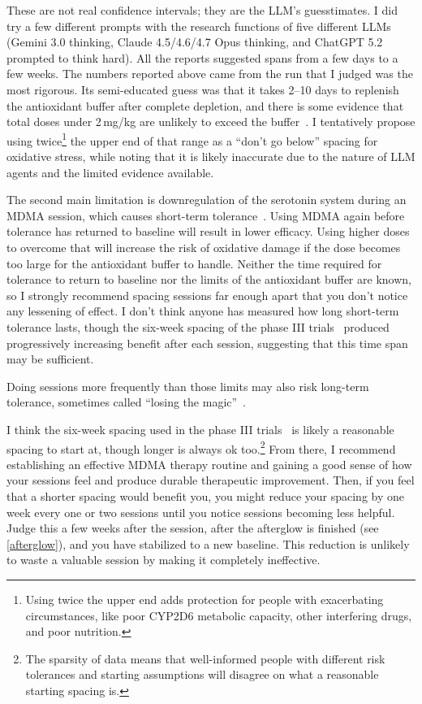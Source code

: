 \documentclass[11pt,oneside]{book}
\let\cite\parencite
\begin{document}
{    These are not real confidence intervals; they are the LLM's guesstimates. I did try a few different prompts with the research functions of five different LLMs (Gemini 3.0 thinking, Claude 4.5/4.6/4.7 Opus thinking, and ChatGPT 5.2 prompted to think hard). All the reports suggested spans from a few days to a few weeks. The numbers reported above came from the run that I judged was the most rigorous.
} Its semi-educated guess was that it takes 2--10 days to replenish the antioxidant buffer after complete depletion, and there is some evidence that total doses under 2\,mg/kg are unlikely to exceed the buffer~\cite{baggottSupplements}. I tentatively propose using twice\footnote{Using twice the upper end adds protection for people with exacerbating circumstances, like poor CYP2D6 metabolic capacity, other interfering drugs, and poor nutrition.} the upper end of that range as a \enquote{don't go below} spacing for oxidative stress, while noting that it is likely inaccurate due to the nature of LLM agents and the limited evidence available.

The second main limitation is downregulation of the serotonin system during an MDMA session, which causes short-term tolerance~\cite{baggottSerotonin,baggottDamage}. Using MDMA again before tolerance has returned to baseline will result in lower efficacy. Using higher doses to overcome that will increase the risk of oxidative damage if the dose becomes too large for the antioxidant buffer to handle. Neither the time required for tolerance to return to baseline nor the limits of the antioxidant buffer are known, so I strongly recommend spacing sessions far enough apart that you don't notice any lessening of effect. I don't think anyone has measured how long short-term tolerance lasts, though the six-week spacing of the phase III trials~\cite{mitchellMDMAClinicalTrial2} produced progressively increasing benefit after each session, suggesting that this time span may be sufficient.

Doing sessions more frequently than those limits may also risk long-term tolerance, sometimes called \enquote{losing the magic}~\cite{baggottSerotonin,baggottDamage}.

I think the six-week spacing used in the phase III trials~\cite{mitchellMDMAClinicalTrial2} is likely a reasonable spacing to start at, though longer is always ok too.\footnote{The sparsity of data means that well-informed people with different risk tolerances and starting assumptions will disagree on what a reasonable starting spacing is.} From there, I recommend establishing an effective MDMA therapy routine and gaining a good sense of how your sessions feel and produce durable therapeutic improvement. Then, if you feel that a shorter spacing would benefit you, you might reduce your spacing by one week every one or two sessions until you notice sessions becoming less helpful. Judge this a few weeks after the session, after the afterglow is finished (see \cref{afterglow}), and you have stabilized to a new baseline. This reduction is unlikely to waste a valuable session by making it completely ineffective.
\end{document}
